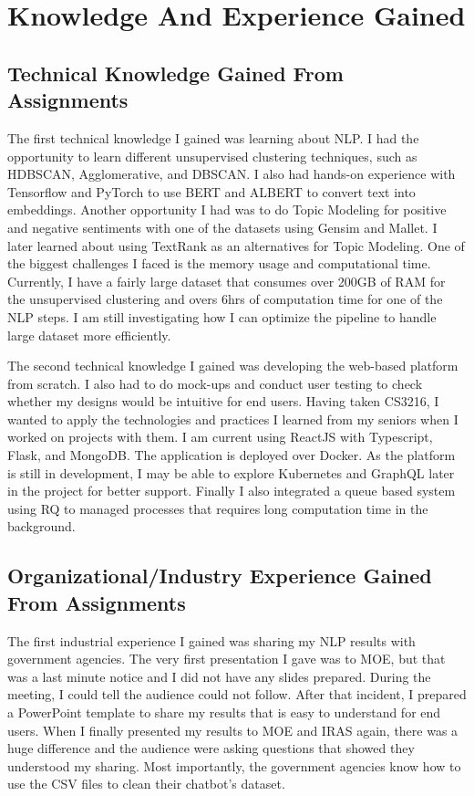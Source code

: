\section{Knowledge And Experience Gained}
\subsection{Technical Knowledge Gained From Assignments}
\noindent
The first technical knowledge I gained was learning about NLP. I had the opportunity to learn different unsupervised clustering techniques, such as HDBSCAN, Agglomerative, and DBSCAN. I also had hands-on experience with Tensorflow and PyTorch to use BERT and ALBERT to convert text into embeddings. Another opportunity I had was to do Topic Modeling for positive and negative sentiments with one of the datasets using Gensim and Mallet. I later learned about using TextRank as an alternatives for Topic Modeling. One of the biggest challenges I faced is the memory usage and computational time. Currently, I have a fairly large dataset that consumes over 200GB of RAM for the unsupervised clustering and overs 6hrs of computation time for one of the NLP steps. I am still investigating how I can optimize the pipeline to handle large dataset more efficiently.

\noindent
The second technical knowledge I gained was developing the web-based platform from scratch. I also had to do mock-ups and conduct user testing to check whether my designs would be intuitive for end users. Having taken CS3216, I wanted to apply the technologies and practices I learned from my seniors when I worked on projects with them. I am current using ReactJS with Typescript, Flask, and MongoDB. The application is deployed over Docker. As the platform is still in development, I may be able to explore Kubernetes and GraphQL later in the project for better support. Finally I also integrated a queue based system using RQ to managed processes that requires long computation time in the background.

\subsection{Organizational/Industry Experience Gained From Assignments}
\noindent
The first industrial experience I gained was sharing my NLP results with government agencies. The very first presentation I gave was to MOE, but that was a last minute notice and I did not have any slides prepared. During the meeting, I could tell the audience could not follow. After that incident, I prepared a PowerPoint template to share my results that is easy to understand for end users. When I finally presented my results to MOE and IRAS again, there was a huge difference and the audience were asking questions that showed they understood my sharing. Most importantly, the government agencies know how to use the CSV files to clean their chatbot's dataset. 

